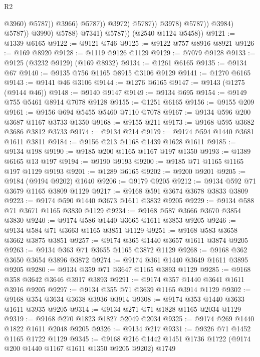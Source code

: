 \begin{lexlean}{R2}
\begin{coremodule}
                                              @3960)
                                            @5787))
                                        @3966)
                                      @5787))
                                  @3972)
                                @5787))
                            @3978)
                          @5787))
                      @3984)
                    @5787))
                @3990)
              @5788)
            @7341)
          @5787))
      (@2540 @1124 @5458))
@9121 := @1339 @6165
@9122 := @9121 @746
@9125 := @9122 @757 @8916 @8921
@9126 := @169 @8920
@9128 := @1119 @9126 @1129
@9129 := @7079 @9128
@9133 := @9125 (@3232 @9129) (@169 @8932)
@9134 := @1261 @6165
@9135 := @9134 @67
@9140 := @9135 @756 @1165 @8915 @3106 @9129
@9141 := @1270 @6165
@9143 := @9141 @46 @3106
@9144 := @1276 @6165
@9147 := @9143 (@1275 (@9144 @46))
@9148 := @9140 @9147
@9149 := @9134 @695
@9154 := @9149 @755 @5461 @8914 @7078 @9128
@9155 := @1251 @6165
@9156 := @9155 @209
@9161 := @9156 @694 @5455 @5460 @7110 @7078
@9167 := @9134 @596 @200 @3687 @1167 @3733 @1350
@9168 := @9155 @211
@9173 := @9168 @595 @3682 @3686 @3812 @3733
@9174 := @9134 @214
@9179 := @9174 @594 @1440 @3681 @1611 @3811
@9184 := @9156 @213 @1168 @1439 @1628 @1611
@9185 := @9134 @198
@9190 := @9185 @200 @1165 @1167 @197 @1350
@9193 := @1389 @6165 @13 @197
@9194 := @9190 @9193
@9200 := @9185 @71 @1165 @1165 @197 @1129 @9193
@9201 := @1289 @6165
@9202 := @9200 @9201
@9205 := @9184 (@9194 @9202) @1640
@9206 := @9179 @9205
@9212 := @9134 @592 @71 @3679 @1165 @3809 @1129
@9217 := @9168 @591 @3674 @3678 @3833 @3809
@9223 := @9174 @590 @1440 @3673 @1611 @3832 @9205
@9229 := @9134 @588 @71 @3671 @1165 @3830 @1129
@9234 := @9168 @587 @3666 @3670 @3854 @3830
@9240 := @9174 @586 @1440 @3665 @1611 @3853 @9205
@9246 := @9134 @584 @71 @3663 @1165 @3851 @1129
@9251 := @9168 @583 @3658 @3662 @3875 @3851
@9257 := @9174 @365 @1440 @3657 @1611 @3874 @9205
@9263 := @9134 @363 @71 @3655 @1165 @3872 @1129
@9268 := @9168 @362 @3650 @3654 @3896 @3872
@9274 := @9174 @361 @1440 @3649 @1611 @3895 @9205
@9280 := @9134 @359 @71 @3647 @1165 @3893 @1129
@9285 := @9168 @358 @3642 @3646 @3917 @3893
@9291 := @9174 @357 @1440 @3641 @1611 @3916 @9205
@9297 := @9134 @355 @71 @3639 @1165 @3914 @1129
@9302 := @9168 @354 @3634 @3638 @3936 @3914
@9308 := @9174 @353 @1440 @3633 @1611 @3935 @9205
@9314 := @9134 @271 @71 @1828 @1165 @2034 @1129
@9319 := @9168 @270 @1823 @1827 @2049 @2034
@9325 := @9174 @269 @1440 @1822 @1611 @2048 @9205
@9326 := @9134 @217
@9331 := @9326 @71 @1452 @1165 @1722 @1129
@9345 := @9168 @216 @1442 @1451 @1736 @1722 (@9174 @200 @1440 @1167 @1611 @1350 @9205 @9202) @1749

\end{coremodule}
\end{lexlean}
